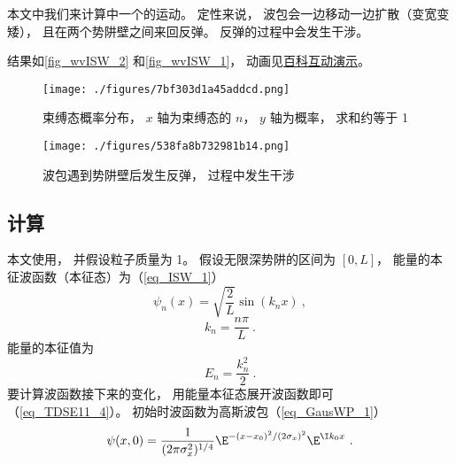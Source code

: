 

本文中我们来计算中一个的运动。 定性来说， 波包会一边移动一边扩散（变宽变矮）， 且在两个势阱壁之间来回反弹。 反弹的过程中会发生干涉。

结果如\autoref{fig_wvISW_2} 和\autoref{fig_wvISW_1}， 动画见\href{https://wuli.wiki/apps/wvISW.html}{百科互动演示}。

\begin{figure}[ht]
\centering
\texttt{[image: ./figures/7bf303d1a45addcd.png]}
\caption{束缚态概率分布， $x$ 轴为束缚态的 $n$， $y$ 轴为概率， 求和约等于 1} \label{fig_wvISW_2}
\end{figure}

\begin{figure}[ht]
\centering
\texttt{[image: ./figures/538fa8b732981b14.png]}
\caption{波包遇到势阱壁后发生反弹， 过程中发生干涉} \label{fig_wvISW_1}
\end{figure}

\subsection{计算}

本文使用， 并假设粒子质量为 1。 假设无限深势阱的区间为 $[0, L]$， 能量的本征波函数（本征态）为（\autoref{eq_ISW_1}）
\begin{equation}
\psi _n(x) = \sqrt{\frac{2}{L}} \sin(k_n x)~,
\end{equation}
\begin{equation}
k_n = \frac{n\pi }{L}~.
\end{equation}
能量的本征值为
\begin{equation}
E_n = \frac{k_n^2}{2}~.
\end{equation}
要计算波函数接下来的变化， 用能量本征态展开波函数即可（\autoref{eq_TDSE11_4}）。 初始时波函数为高斯波包（\autoref{eq_GausWP_1}）
\begin{equation}
\psi (x,0) = \frac{1}{(2\pi \sigma _x ^2)^{1/4}} \E^{-(x - x_0)^2/(2\sigma _x)^2} \E^{\I k_0x}~.
\end{equation}


